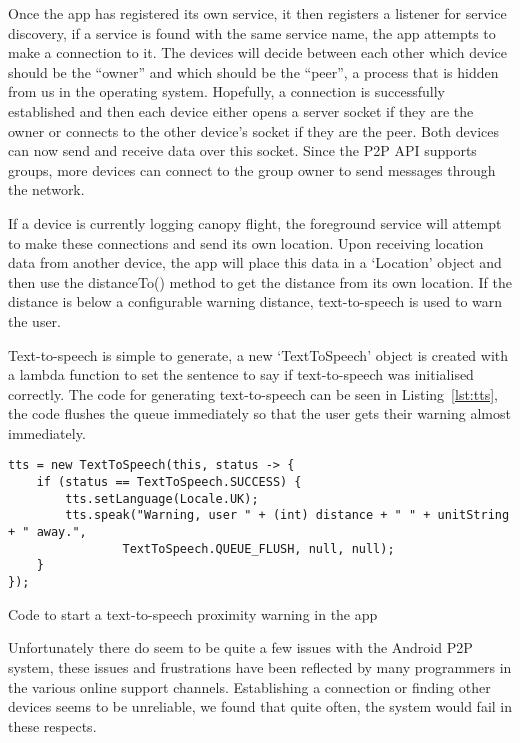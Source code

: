 Once the app has registered its own service, it then registers a listener for service discovery, if a service is found with the same service name, the app attempts to make a connection to it. The devices will decide between each other which device should be the ``owner'' and which should be the ``peer'', a process that is hidden from us in the operating system. Hopefully, a connection is successfully established and then each device either opens a server socket if they are the owner or connects to the other device's socket if they are the peer. Both devices can now send and receive data over this socket. Since the P2P API supports groups, more devices can connect to the group owner to send messages through the network.

If a device is currently logging canopy flight, the foreground service will attempt to make these connections and send its own location. Upon receiving location data from another device, the app will place this data in a `Location' object and then use the distanceTo() method to get the distance from its own location. If the distance is below a configurable warning distance, text-to-speech is used to warn the user.

Text-to-speech is simple to generate, a new `TextToSpeech' object is created with a lambda function to set the sentence to say if text-to-speech was initialised correctly. The code for generating text-to-speech can be seen in Listing~\vref{lst:tts}, the code flushes the queue immediately so that the user gets their warning almost immediately.

\begin{listing*}
  \centering
  \begin{verbatim}
tts = new TextToSpeech(this, status -> {
    if (status == TextToSpeech.SUCCESS) {
        tts.setLanguage(Locale.UK);
        tts.speak("Warning, user " + (int) distance + " " + unitString + " away.",
                TextToSpeech.QUEUE_FLUSH, null, null);
    }
});
  \end{verbatim}
  \caption{Code to start a text-to-speech proximity warning in the app}\label{lst:tts}
\end{listing*}

Unfortunately there do seem to be quite a few issues with the Android P2P system, these issues and frustrations have been reflected by many programmers in the various online support channels. Establishing a connection or finding other devices seems to be unreliable, we found that quite often, the system would fail in these respects.

